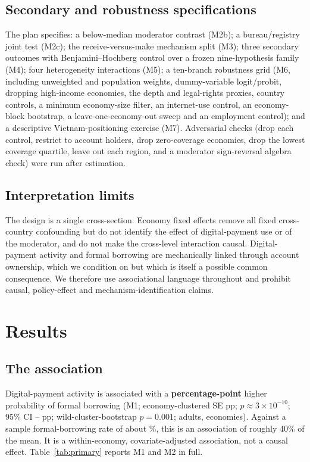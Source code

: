 \subsection{Secondary and robustness specifications}

The plan specifies: a below-median moderator contrast (M2b); a bureau/registry joint test
(M2c); the receive-versus-make mechanism split (M3); three secondary outcomes with
Benjamini--Hochberg control over a frozen nine-hypothesis family (M4); four heterogeneity
interactions (M5); a ten-branch robustness grid (M6, including unweighted and population
weights, dummy-variable logit/probit, dropping high-income economies, the depth and
legal-rights proxies, country controls, a minimum economy-size filter, an internet-use
control, an economy-block bootstrap, a leave-one-economy-out sweep and an employment
control); and a descriptive Vietnam-positioning exercise (M7). Adversarial checks (drop each
control, restrict to account holders, drop zero-coverage economies, drop the lowest coverage
quartile, leave out each region, and a moderator sign-reversal algebra check) were run after
estimation.

\subsection{Interpretation limits}

The design is a single cross-section. Economy fixed effects remove all fixed cross-country
confounding but do not identify the effect of digital-payment use or of the moderator, and
do not make the cross-level interaction causal. Digital-payment activity and formal
borrowing are mechanically linked through account ownership, which we condition on but which
is itself a possible common consequence. We therefore use associational language throughout
and prohibit causal, policy-effect and mechanism-identification claims.

\section{Results}

\subsection{The association}

Digital-payment activity is associated with a \textbf{\MOneBeta{} percentage-point} higher
probability of formal borrowing (M1; economy-clustered SE \MOneSE{} pp;
$p\approx 3\times10^{-10}$; 95\% CI \MOneCIlo{}--\MOneCIhi{} pp; wild-cluster-bootstrap
$p=0.001$; \NAdults{} adults, \NEconomies{} economies). Against a sample formal-borrowing
rate of about \FormalBorrowMean\%, this is an association of roughly 40\% of the mean. It is
a within-economy, covariate-adjusted association, not a causal effect.
Table~\ref{tab:primary} reports M1 and M2 in full.


